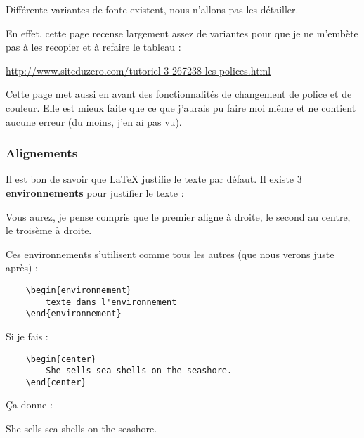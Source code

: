 {Différente variantes de fonte existent, nous n'allons pas les détailler.

En effet, cette page recense largement assez de variantes pour que je ne m'embète pas à les recopier et à refaire le tableau :

\begin{center}
    \url{http://www.siteduzero.com/tutoriel-3-267238-les-polices.html}
\end{center}

Cette page met aussi en avant des fonctionnalités de changement de police et de couleur.
Elle est mieux faite que ce que j'aurais pu faire moi même et ne contient aucune erreur (du moins, j'en ai pas vu).


\subsubsection{Alignements} %
\label{ssub:Alignements}

Il est bon de savoir que \LaTeX{} justifie le texte par défaut. Il existe 3 {\bf environnements} pour justifier le texte :

Vous aurez, je pense compris que le premier aligne à droite, le second au centre, le troisème à droite.

Ces environnements s'utilisent comme tous les autres (que nous verons juste après) :
\begin{verbatim}
    \begin{environnement}
        texte dans l'environnement
    \end{environnement}
\end{verbatim}

Si je fais :
\begin{verbatim}
    \begin{center}
        She sells sea shells on the seashore.
    \end{center}
\end{verbatim}

Ça donne :
    \begin{center}
        She sells sea shells on the seashore.
    \end{center}

}
